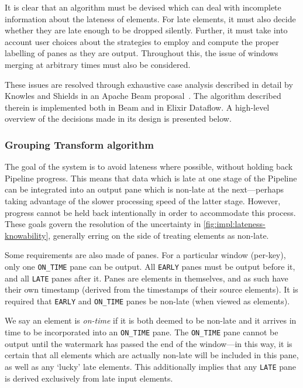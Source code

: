It is clear that an algorithm must be devised which can deal with incomplete information about the lateness of elements.
For late elements, it must also decide whether they are late enough to be dropped silently.
Further, it must take into account user choices about the strategies to employ and compute the proper labelling of panes as they are output.
Throughout this, the issue of windows merging at arbitrary times must also be considered.

These issues are resolved through exhaustive case analysis described in detail by Knowles and Shields in an Apache Beam proposal~\cite{BEAM-doc-lateness}.
The algorithm described therein is implemented both in Beam and in Elixir Dataflow.
A high-level overview of the decisions made in its design is presented below.

\subsubsection{Grouping Transform algorithm}

The goal of the system is to avoid lateness where possible, without holding back Pipeline progress.
This means that data which is late at one stage of the Pipeline can be integrated into an output pane which is non-late at the next---perhaps taking advantage of the slower processing speed of the latter stage.
However, progress cannot be held back intentionally in order to accommodate this process.
These goals govern the resolution of the uncertainty in \cref{fig:impl:lateness-knowability}, generally erring on the side of treating elements as non-late.

Some requirements are also made of panes.
For a particular window (per-key), only one \verb|ON_TIME| pane can be output.
All \verb|EARLY| panes must be output before it, and all \verb|LATE| panes after it.
Panes are elements in themselves, and as such have their own timestamp (derived from the timestamps of their source elements).
It is required that \verb|EARLY| and \verb|ON_TIME| panes be non-late (when viewed as elements).

We say an element is \emph{on-time} if it is both deemed to be non-late and it arrives in time to be incorporated into an \verb|ON_TIME| pane.
The \verb|ON_TIME| pane cannot be output until the watermark has passed the end of the window---in this way, it is certain that all elements which are actually non-late will be included in this pane, as well as any `lucky' late elements.
This additionally implies that any \verb|LATE| pane is derived exclusively from late input elements.

